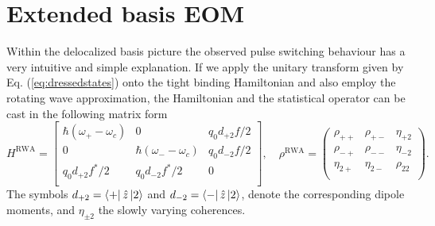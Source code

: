 \documentclass[]{spie}  %
\begin{document}
\section{Extended basis EOM}
Within the delocalized basis picture the observed pulse switching behaviour has a very intuitive and simple explanation. If we apply the unitary transform given by Eq. (\ref{eq:dressedstates}) onto the tight binding Hamiltonian and also employ the rotating wave approximation, the Hamiltonian and the statistical operator can be cast in the following matrix form
\begin{equation}
H^{\text{RWA}} = \begin{bmatrix}
\hbar (\omega_+-\omega_c) & 0 & q_0d_{+2}f/2 \\
0 & \hbar (\omega_--\omega_c) & q_0d_{-2}f/2 \\
q_0d_{+2}f^*/2 & q_0d_{-2}f^*/2 & 0 \\
\end{bmatrix},\quad \rho^{\text{RWA}} = \begin{pmatrix}
\rho_{++} & \rho_{+-} & \eta_{+2} \\ 
\rho_{-+} & \rho_{--} & \eta_{-2} \\ 
\eta_{2+} & \eta_{2-} & \rho_{22} \\ 
\end{pmatrix}.
\end{equation}
The symbols $d_{+2} = \Bra{+}\hat{z}\Ket{2} $ and $d_{-2} = \Bra{-}\hat{z}\Ket{2} $, denote the corresponding dipole moments, and $ \eta_{\pm 2}$ the slowly varying coherences. 
\end{document}
